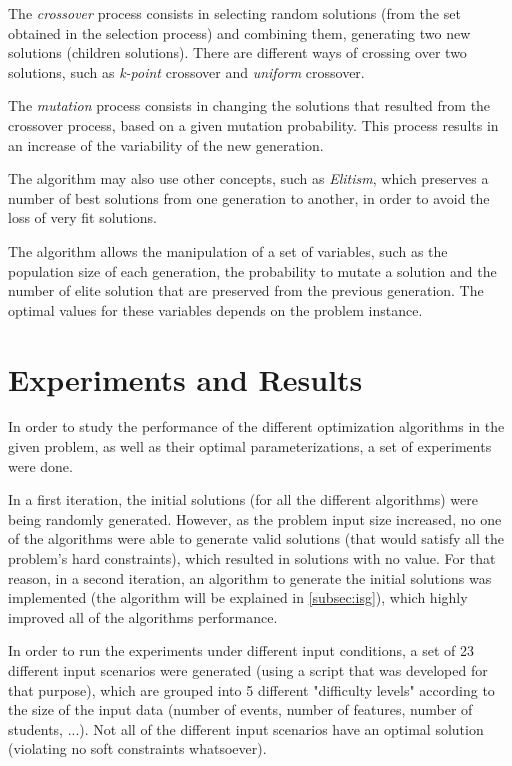 \documentclass[conference]{IEEEtran}
\begin{document}
The \textit{crossover} process consists in selecting random solutions (from the set obtained in the selection process) and combining them, generating two new solutions (children solutions). There are different ways of crossing over two solutions, such as \textit{k-point} crossover and \textit{uniform} crossover.

The \textit{mutation} process consists in changing the solutions that resulted from the crossover process, based on a given mutation probability. This process results in an increase of the variability of the new generation.

The algorithm may also use other concepts, such as \textit{Elitism}, which preserves a number of best solutions from one generation to another, in order to avoid the loss of very fit solutions.

The algorithm allows the manipulation of a set of variables, such as the population size of each generation, the probability to mutate a solution and the number of elite solution that are preserved from the previous generation. The optimal values for these variables depends on the problem instance.

\section{Experiments and Results} \label{sec:ear}

In order to study the performance of the different optimization algorithms in the given problem, as well as their optimal parameterizations, a set of experiments were done.

In a first iteration, the initial solutions (for all the different algorithms) were being randomly generated. However, as the problem input size increased, no one of the algorithms were able to generate valid solutions (that would satisfy all the problem's hard constraints), which resulted in solutions with no value. For that reason, in a second iteration, an algorithm to generate the initial solutions was implemented (the algorithm will be explained in \autoref{subsec:isg}), which highly improved all of the algorithms performance.

In order to run the experiments under different input conditions, a set of 23 different input scenarios were generated (using a script that was developed for that purpose), which are grouped into 5 different "difficulty levels" according to the size of the input data (number of events, number of features, number of students, ...). Not all of the different input scenarios have an optimal solution (violating no soft constraints whatsoever).
\end{document}
